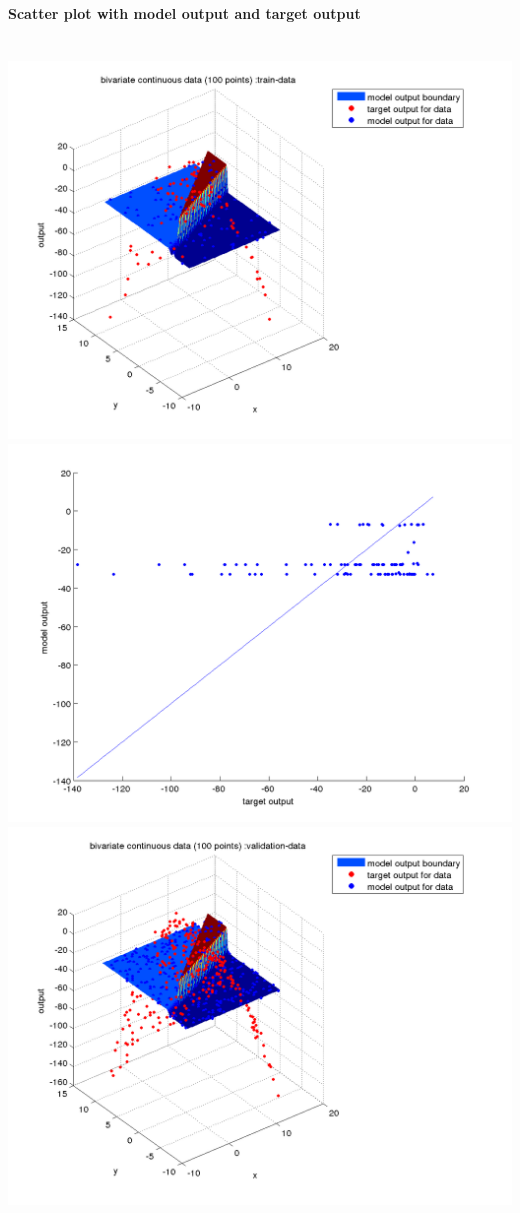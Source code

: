 \documentclass[fleqn]{article}
\newcommand{\myparagraph}[1]{\paragraph{#1}\mbox{}\\}
\begin{document}
\myparagraph{Scatter plot with model output and target output}
\includegraphics[scale=0.4]{./pics/bivariate100/_2_4/_2_4_epoch_2_train-data_scatter3d}
\includegraphics[scale=0.4]{./pics/bivariate100/_2_4/_2_4_epoch_2_train-data_scatter2d}
\includegraphics[scale=0.4]{./pics/bivariate100/_2_4/_2_4_epoch_2_validation-data_scatter3d}
\end{document}
